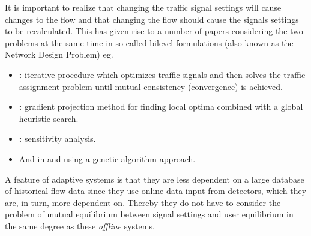 It is important to realize that changing the traffic signal settings
will cause changes to the flow and that changing the flow should cause
the signals settings to be recalculated. This has given rise to a
number of papers considering the two problems at the same time in
so-called bilevel formulations (also known as the Network Design
Problem) eg.
\begin{itemize}
\item \textbf{\cite{mc}:} iterative procedure which optimizes traffic signals and then solves the traffic assignment problem until mutual consistency (convergence) is achieved.
\item \textbf{\cite{34}:} gradient projection method for finding local optima combined with a global heuristic search.
\item \textbf{\cite{20}:} sensitivity analysis.
\item And in \textbf{\cite{2}} and \textbf{\cite{27}} using a genetic algorithm approach.
\end{itemize}

A feature of adaptive systems is that they are less dependent on a
large database of historical flow data since they use online data
input from detectors, which they are, in turn, more dependent
on. Thereby they do not have to consider the problem of mutual
equilibrium between signal settings and user equilibrium in the same
degree as these \textit{offline} systems.

